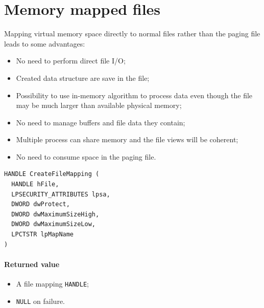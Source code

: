 \section{Memory mapped files}
Mapping virtual memory space directly to normal files rather than the paging file leads to some advantages:
\begin{itemize}
\item No need to perform direct file I/O;
\item Created data structure are save in the file;
\item Possibility to use in-memory algorithm to process data even though the file may be much larger than available physical memory;
\item No need to manage buffers and file data they contain;
\item Multiple process can share memory and the file views will be coherent;
\item No need to consume space in the paging file.
\end{itemize}

\begin{verbatim}
HANDLE CreateFileMapping (
  HANDLE hFile,
  LPSECURITY_ATTRIBUTES lpsa,
  DWORD dwProtect,
  DWORD dwMaximumSizeHigh,
  DWORD dwMaximumSizeLow,
  LPCTSTR lpMapName
)
\end{verbatim}

\paragraph{Returned value}
\begin{itemize}
\item A file mapping \texttt{HANDLE};
\item \texttt{NULL} on failure.
\end{itemize}

